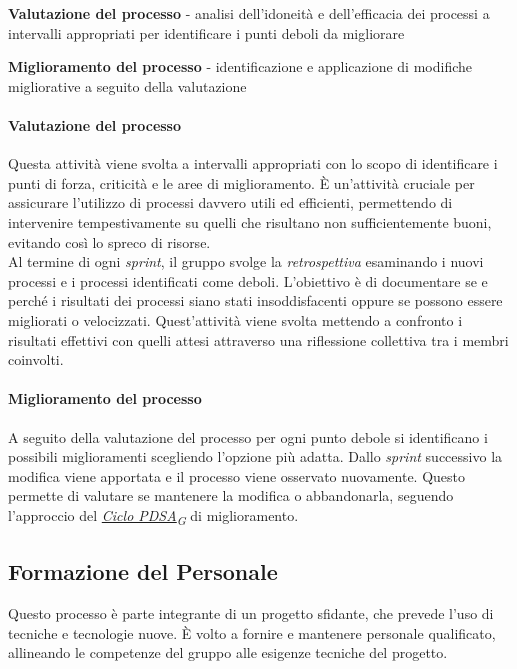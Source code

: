 \documentclass[12pt, a4paper]{article}
\newcommand{\urlglossario}{https://skynetunigroup.github.io/Code_Guardian/Documentazione/PB/glossario_v2.0.0.pdf} %
\newcommand{\glo}[2]{\href{\urlglossario\#nameddest=#2}{#1\textsubscript{G}}}
\begin{document}
\textbf{Valutazione del processo} - analisi dell'idoneità e dell'efficacia dei processi a intervalli appropriati per identificare i punti deboli da migliorare

\textbf{Miglioramento del processo} - identificazione e applicazione di modifiche migliorative a seguito della valutazione

\paragraph{Valutazione del processo}

Questa attività viene svolta a intervalli appropriati con lo scopo di identificare i punti di forza, criticità e le aree di miglioramento. È un'attività cruciale per assicurare l'utilizzo di processi davvero utili ed efficienti, permettendo di intervenire tempestivamente su quelli che risultano non sufficientemente buoni, evitando così lo spreco di risorse.\\
Al termine di ogni \textit{sprint}, il gruppo svolge la \textit{retrospettiva} esaminando i nuovi processi e i processi identificati come deboli. L'obiettivo è di documentare se e perché i risultati dei processi siano stati insoddisfacenti oppure se possono essere migliorati o velocizzati. Quest'attività viene svolta mettendo a confronto i risultati effettivi con quelli attesi attraverso una riflessione collettiva tra i membri coinvolti.

 \paragraph{Miglioramento del processo}

A seguito della valutazione del processo per ogni punto debole si identificano i possibili miglioramenti scegliendo l'opzione più adatta. Dallo \textit{sprint} successivo la modifica viene apportata e il processo viene osservato nuovamente. Questo permette di valutare se mantenere la modifica o abbandonarla, seguendo l'approccio del \textit{\glo{Ciclo PDSA}{ciclo-pdsa}} di miglioramento.

 \subsection{Formazione del Personale}

Questo processo è parte integrante di un progetto sfidante, che prevede l'uso di tecniche e tecnologie nuove. È volto a fornire e mantenere personale qualificato, allineando le competenze del gruppo alle esigenze tecniche del progetto.
\end{document}
